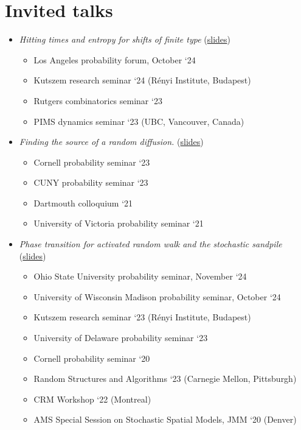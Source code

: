 \documentclass[letterpaper]{article}
\begin{document}
\section*{Invited talks}
\begin{itemize}
 \item {\em{Hitting times and entropy for shifts of finite type}} (\href{https://jfrichey.github.io/pagedocs/sfttalk_halloween.pdf}{slides}) 
	\begin{itemize}
		\item Los Angeles probability forum, October `24
		\item Kutszem research seminar `24 (Rényi Institute, Budapest)
 		\item Rutgers combinatorics seminar `23
 		\item PIMS dynamics seminar `23 (UBC, Vancouver, Canada) 
	\end{itemize}
	
 \item {\em{Finding the source of a random diffusion.}} (\href{https://jfrichey.github.io/pagedocs/cornell_sourcefind.pdf}{slides}) 
 \begin{itemize} 
 	\item Cornell probability seminar `23
 	\item CUNY probability seminar `23
 	\item Dartmouth colloquium `21
 	\item University of Victoria probability seminar `21
\end{itemize}

 \item {\em{Phase transition for activated random walk and the stochastic sandpile}} (\href{https://jfrichey.github.io/pagedocs/kutszem_SSM_talk.pdf}{slides}) 
 \begin{itemize} 
	\item Ohio State University probability seminar, November `24
	\item University of Wisconsin Madison probability seminar, October `24
 	\item Kutszem research seminar `23 (Rényi Institute, Budapest)
 	\item University of Delaware probability seminar `23 
 	\item Cornell probability seminar `20
 	\item Random Structures and Algorithms `23 (Carnegie Mellon, Pittsburgh)
 	\item CRM Workshop `22 (Montreal)
 	\item AMS Special Session on Stochastic Spatial Models, JMM `20 (Denver)
 \end{itemize}
 

\end{itemize}
\end{document}
